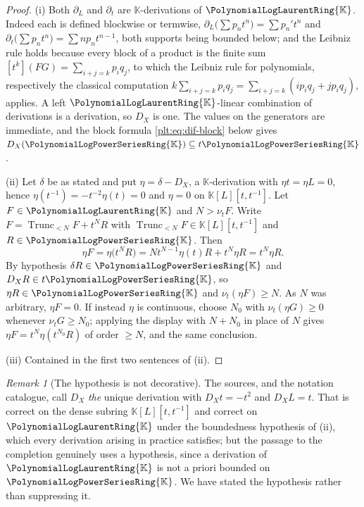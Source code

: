 \documentclass[11pt,oneside]{article}
\theoremstyle{plain}
\theoremstyle{definition}
\theoremstyle{remark}
\newtheorem{remark}[theorem]{Remark}
\newcommand{\K}{\mathbb{K}}
\newcommand{\PLpow}{\PolynomialLogPowerSeriesRing{\K}}   %
\newcommand{\PLlau}{\PolynomialLogLaurentRing{\K}}       %
\newcommand{\ordt}{\nu_{t}}                              %
\newcommand{\Trunc}[2]{\operatorname{Trunc}_{<#2}#1}     %
\newcommand{\DX}{D_{X}}                                  %
\begin{document}
\begin{proof}
(i)  Both \(\partial_{L}\) and \(\partial_{t}\) are \(\K\)-derivations of
\(\PLlau\).  Indeed each is defined blockwise or termwise,
\(\partial_{L}\bigl(\sum p_{n}t^{n}\bigr)=\sum p_{n}'t^{n}\) and
\(\partial_{t}\bigl(\sum p_{n}t^{n}\bigr)=\sum np_{n}t^{n-1}\), both supports
being bounded below; and the Leibniz rule holds because every block of a
product is the finite sum \([t^{k}](FG)=\sum_{i+j=k}p_{i}q_{j}\), to which the
Leibniz rule for polynomials, respectively the classical computation
\(k\sum_{i+j=k}p_{i}q_{j}=\sum_{i+j=k}(ip_{i}q_{j}+jp_{i}q_{j})\), applies.  A
left \(\PLlau\)-linear combination of derivations is a derivation, so \(\DX\)
is one.  The values on the generators are immediate, and the block formula
\cref{plt:eq:dif-block} below gives \(\DX(\PLpow)\subseteq t\PLpow\).

(ii)  Let \(\delta\) be as stated and put \(\eta=\delta-\DX\), a
\(\K\)-derivation with \(\eta t=\eta L=0\), hence \(\eta(t^{-1})
=-t^{-2}\eta(t)=0\) and \(\eta=0\) on \(\K[L][t,t^{-1}]\).  Let
\(F\in\PLlau\) and \(N>\ordt F\).  Write \(F=\Trunc{F}{N}+t^{N}R\) with
\(\Trunc{F}{N}\in\K[L][t,t^{-1}]\) and \(R\in\PLpow\).  Then
\[
  \eta F=\eta\bigl(t^{N}R\bigr)
  =Nt^{N-1}\eta(t)R+t^{N}\eta R=t^{N}\eta R .
\]
By hypothesis \(\delta R\in\PLpow\) and \(\DX R\in t\PLpow\), so
\(\eta R\in\PLpow\) and \(\ordt(\eta F)\ge N\).  As \(N\) was arbitrary,
\(\eta F=0\).  If instead \(\eta\) is continuous, choose \(N_{0}\) with
\(\ordt(\eta G)\ge0\) whenever \(\ordt G\ge N_{0}\); applying the display with
\(N+N_{0}\) in place of \(N\) gives \(\eta F=t^{N}\eta(t^{N_{0}}R)\) of order
\(\ge N\), and the same conclusion.

(iii)  Contained in the first two sentences of (ii).
\end{proof}

\begin{remark}[The hypothesis is not decorative]
\label{plt:rmk:dif-uniqueness-hypothesis}
The sources, and the notation catalogue, call \(\DX\) \emph{the} unique
derivation with \(\DX t=-t^{2}\) and \(\DX L=t\).  That is correct on the dense
subring \(\K[L][t,t^{-1}]\) and correct on \(\PLlau\) under the boundedness
hypothesis of (ii), which every derivation arising in practice satisfies; but
the passage to the completion genuinely uses a hypothesis, since a derivation
of \(\PLlau\) is not a priori bounded on \(\PLpow\).  We have stated the
hypothesis rather than suppressing it.
\end{remark}
\end{document}
